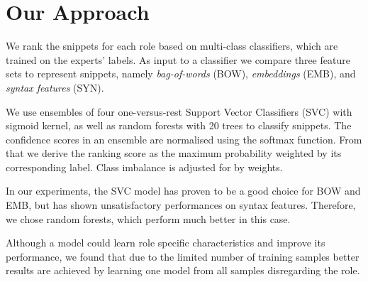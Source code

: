 \section{Our Approach}
We rank the snippets for each role based on multi-class classifiers, which are trained on the experts' labels.
As input to a classifier we compare three feature sets to represent snippets, namely \emph{bag-of-words} (BOW), \emph{embeddings} (EMB), and \emph{syntax features} (SYN).

We use ensembles of four one-versus-rest Support Vector Classifiers (SVC) with sigmoid kernel, as well as random forests with 20 trees to classify snippets.
The confidence scores in an ensemble are normalised using the softmax function.
From that we derive the ranking score as the maximum probability weighted by its corresponding label.
Class imbalance is adjusted for by weights.

In our experiments, the SVC model has proven to be a good choice for BOW and EMB, but has shown unsatisfactory performances on syntax features.
Therefore, we chose random forests, which perform much better in this case.

Although a model could learn role specific characteristics and improve its performance, we found that due to the limited number of training samples better results are achieved by learning one model from all samples disregarding the role.

 


